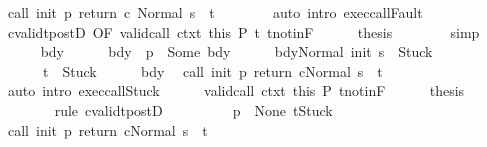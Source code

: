 \begin{isabellebody}
\ {\isachardoublequoteopen}{\isasymGamma}{\isasymturnstile}{\isasymlangle}call\ init\ p\ return{\isacharprime}\ c\ {\isacharcomma}Normal\ s{\isasymrangle}\ {\isasymRightarrow}\ t{\isachardoublequoteclose}\isanewline
\ \ \ \ \ \ \isamarkupfalse%
\ {\isacharparenleft}auto\ intro{\isacharcolon}\ exec{\isacharunderscore}callFault{\isacharparenright}\isanewline
\ \ \ \ \isamarkupfalse%
\ cvalidt{\isacharunderscore}postD\ {\isacharbrackleft}OF\ valid{\isacharunderscore}call\ ctxt\ this\ P{\isacharbrackright}\ t\ t{\isacharunderscore}notin{\isacharunderscore}F\isanewline
\ \ \ \ \isamarkupfalse%
\ {\isacharquery}thesis\isanewline
\ \ \ \ \ \ \isamarkupfalse%
\ simp\isanewline
\ \ \isamarkupfalse%
\isanewline
\ \ \ \ \isamarkupfalse%
\ bdy\isanewline
\ \ \ \ \isamarkupfalse%
\ bdy{\isacharcolon}\ {\isachardoublequoteopen}{\isasymGamma}\ p\ {\isacharequal}\ Some\ bdy{\isachardoublequoteclose}\isanewline
\ \ \ \ \isamarkupfalse%
\ {\isachardoublequoteopen}{\isasymGamma}{\isasymturnstile}{\isasymlangle}bdy{\isacharcomma}Normal\ {\isacharparenleft}init\ s{\isacharparenright}{\isasymrangle}\ {\isasymRightarrow}\ Stuck{\isachardoublequoteclose}\ \ \isanewline
\ \ \ \ \ \ {\isachardoublequoteopen}t\ {\isacharequal}\ Stuck{\isachardoublequoteclose}\isanewline
\ \ \ \ \isamarkupfalse%
\ bdy\ \isamarkupfalse%
\ {\isachardoublequoteopen}{\isasymGamma}{\isasymturnstile}{\isasymlangle}call\ init\ p\ return{\isacharprime}\ c{\isacharcomma}Normal\ s{\isasymrangle}\ {\isasymRightarrow}\ t{\isachardoublequoteclose}\isanewline
\ \ \ \ \ \ \isamarkupfalse%
\ {\isacharparenleft}auto\ intro{\isacharcolon}\ exec{\isacharunderscore}callStuck{\isacharparenright}\isanewline
\ \ \ \ \isamarkupfalse%
\ valid{\isacharunderscore}call\ ctxt\ this\ P\ t{\isacharunderscore}notin{\isacharunderscore}F\isanewline
\ \ \ \ \isamarkupfalse%
\ {\isacharquery}thesis\isanewline
\ \ \ \ \ \ \isamarkupfalse%
\ {\isacharparenleft}rule\ cvalidt{\isacharunderscore}postD{\isacharparenright}\isanewline
\ \ \isamarkupfalse%
\isanewline
\ \ \ \ \isamarkupfalse%
\ {\isachardoublequoteopen}{\isasymGamma}\ p\ {\isacharequal}\ None{\isachardoublequoteclose}\ {\isachardoublequoteopen}t{\isacharequal}Stuck{\isachardoublequoteclose}\isanewline
\ \ \ \ \isamarkupfalse%
\ {\isachardoublequoteopen}{\isasymGamma}{\isasymturnstile}{\isasymlangle}call\ init\ p\ return{\isacharprime}\ c{\isacharcomma}Normal\ s{\isasymrangle}\ {\isasymRightarrow}\ t{\isachardoublequoteclose}\isanewline

\end{isabellebody}
